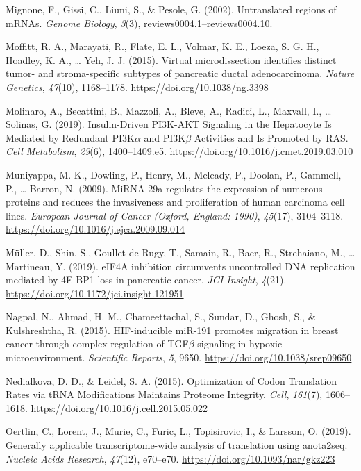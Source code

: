 \documentclass[12pt,openany]{book}
\begin{document}
\hypertarget{ref-Mignone2002}{}
Mignone, F., Gissi, C., Liuni, S., \& Pesole, G. (2002). Untranslated
regions of mRNAs. \emph{Genome Biology}, \emph{3}(3),
reviews0004.1--reviews0004.10.

\hypertarget{ref-Moffitt2015}{}
Moffitt, R. A., Marayati, R., Flate, E. L., Volmar, K. E., Loeza, S. G.
H., Hoadley, K. A., \ldots{} Yeh, J. J. (2015). Virtual microdissection
identifies distinct tumor- and stroma-specific subtypes of pancreatic
ductal adenocarcinoma. \emph{Nature Genetics}, \emph{47}(10),
1168--1178. \url{https://doi.org/10.1038/ng.3398}

\hypertarget{ref-Molinaro2019}{}
Molinaro, A., Becattini, B., Mazzoli, A., Bleve, A., Radici, L.,
Maxvall, I., \ldots{} Solinas, G. (2019). Insulin-Driven PI3K-AKT
Signaling in the Hepatocyte Is Mediated by Redundant PI3K\(\alpha\) and
PI3K\(\beta\) Activities and Is Promoted by RAS. \emph{Cell Metabolism},
\emph{29}(6), 1400--1409.e5.
\url{https://doi.org/10.1016/j.cmet.2019.03.010}

\hypertarget{ref-Muniyappa2009}{}
Muniyappa, M. K., Dowling, P., Henry, M., Meleady, P., Doolan, P.,
Gammell, P., \ldots{} Barron, N. (2009). MiRNA-29a regulates the
expression of numerous proteins and reduces the invasiveness and
proliferation of human carcinoma cell lines. \emph{European Journal of
Cancer (Oxford, England: 1990)}, \emph{45}(17), 3104--3118.
\url{https://doi.org/10.1016/j.ejca.2009.09.014}

\hypertarget{ref-Muller2019}{}
Müller, D., Shin, S., Goullet de Rugy, T., Samain, R., Baer, R.,
Strehaiano, M., \ldots{} Martineau, Y. (2019). eIF4A inhibition
circumvents uncontrolled DNA replication mediated by 4E-BP1 loss in
pancreatic cancer. \emph{JCI Insight}, \emph{4}(21).
\url{https://doi.org/10.1172/jci.insight.121951}

\hypertarget{ref-Nagpal2015}{}
Nagpal, N., Ahmad, H. M., Chameettachal, S., Sundar, D., Ghosh, S., \&
Kulshreshtha, R. (2015). HIF-inducible miR-191 promotes migration in
breast cancer through complex regulation of TGF\(\beta\)-signaling in
hypoxic microenvironment. \emph{Scientific Reports}, \emph{5}, 9650.
\url{https://doi.org/10.1038/srep09650}

\hypertarget{ref-Nedialkova2015}{}
Nedialkova, D. D., \& Leidel, S. A. (2015). Optimization of Codon
Translation Rates via tRNA Modifications Maintains Proteome Integrity.
\emph{Cell}, \emph{161}(7), 1606--1618.
\url{https://doi.org/10.1016/j.cell.2015.05.022}

\hypertarget{ref-Oertlin2019}{}
Oertlin, C., Lorent, J., Murie, C., Furic, L., Topisirovic, I., \&
Larsson, O. (2019). Generally applicable transcriptome-wide analysis of
translation using anota2seq. \emph{Nucleic Acids Research},
\emph{47}(12), e70--e70. \url{https://doi.org/10.1093/nar/gkz223}
\end{document}
